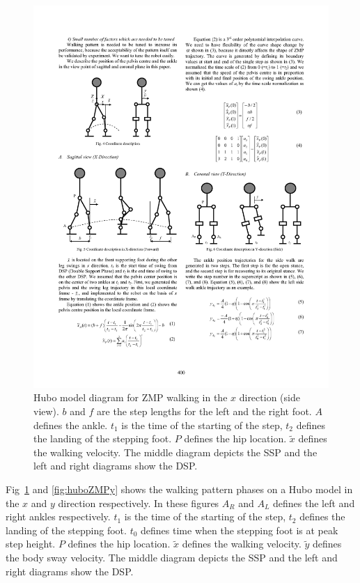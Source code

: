 \begin{figure}[t]
  \centering
\includegraphics[width=0.5\columnwidth]{./examples/pix/huboZMPx.pdf}
  \caption{Hubo model diagram for ZMP walking in the $x$ direction (side view).  $b$ and $f$ are the step lengths for the left and the right foot.  $A$ defines the ankle.  $t_1$ is the time of the starting of the step, $t_2$ defines the landing of the stepping foot.  $P$ defines the hip location.  $\widetilde{x}$ defines the walking velocity.  The middle diagram depicts the SSP and the left and right diagrams show the DSP.}
  \label{fig:huboZMPx}
\end{figure}

Fig~\ref{fig:huboZMPx} and \ref{fig:huboZMPy} shows the walking pattern phases on a Hubo model in the $x$ and $y$ direction respectively.
In these figures $A_R$ and $A_L$ defines the left and right ankles respectively.  
$t_1$ is the time of the starting of the step, $t_2$ defines the landing of the stepping foot.  
$t_0$ defines time when the stepping foot is at peak step height.  
$P$ defines the hip location.  
$\widetilde{x}$ defines the walking velocity.
$\widetilde{y}$ defines the body sway velocity.  
The middle diagram depicts the SSP and the left and right diagrams show the DSP.



